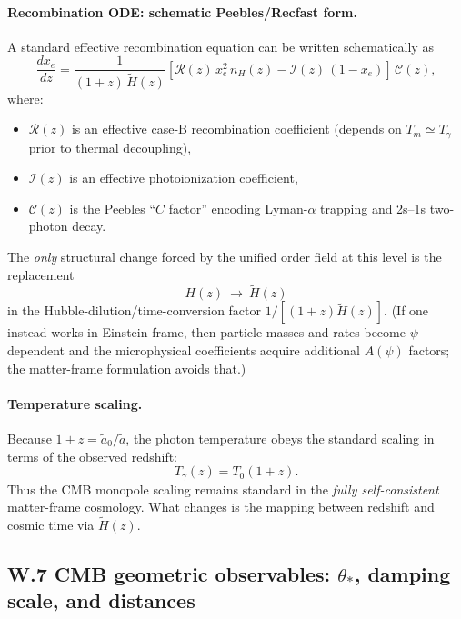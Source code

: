 \documentclass[10pt]{article}
\begin{document}
\paragraph{Recombination ODE: schematic Peebles/Recfast form.}
A standard effective recombination equation can be written schematically as
\begin{equation}
\frac{dx_e}{dz}
=
\frac{1}{(1+z)\,\tilde H(z)}
\left[
\mathcal{R}(z)\,x_e^2\,n_H(z)
-
\mathcal{I}(z)\,(1-x_e)
\right]\,
\mathcal{C}(z),
\label{eq:W_xe_general}
\end{equation}
where:
\begin{itemize}[leftmargin=1.2em]
\item $\mathcal{R}(z)$ is an effective case-B recombination coefficient (depends on $T_m\simeq T_\gamma$ prior to thermal decoupling),
\item $\mathcal{I}(z)$ is an effective photoionization coefficient,
\item $\mathcal{C}(z)$ is the Peebles ``$C$ factor'' encoding Lyman-$\alpha$ trapping and 2s--1s two-photon decay.
\end{itemize}
The \emph{only} structural change forced by the unified order field at this level is the replacement
\[
H(z)\ \longrightarrow\ \tilde H(z)
\]
in the Hubble-dilution/time-conversion factor $1/[(1+z)\tilde H(z)]$.
(If one instead works in Einstein frame, then particle masses and rates become $\psi$-dependent and the
microphysical coefficients acquire additional $A(\psi)$ factors; the matter-frame formulation avoids that.)

\paragraph{Temperature scaling.}
Because $1+z=\tilde a_0/\tilde a$, the photon temperature obeys the standard scaling in terms of the observed redshift:
\begin{equation}
T_\gamma(z) = T_0(1+z).
\label{eq:W_T_scaling}
\end{equation}
Thus the CMB monopole scaling remains standard in the \emph{fully self-consistent} matter-frame cosmology.
What changes is the mapping between redshift and cosmic time via $\tilde H(z)$.

\subsection{W.7 CMB geometric observables: $\theta_\ast$, damping scale, and distances}
\label{app:early_universe:cmb_geometry}
\end{document}
